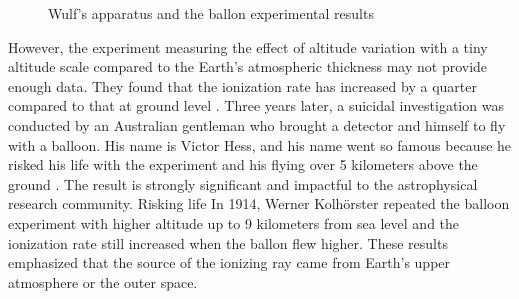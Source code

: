 \begin{figure}[h!]
    \centering
        \hfill
        \caption{Wulf's apparatus and the ballon experimental results}
       \label{fig:xxx}
\end{figure}


However, the experiment measuring the effect of altitude
variation with a tiny altitude scale compared to the Earth's
atmospheric thickness may not provide enough data.
They found that the ionization rate
has increased by a quarter compared to that at ground level
\citep{de2014atmospheric}.
Three years later, a suicidal investigation was conducted by 
an Australian gentleman who brought a detector and himself
to fly with a balloon.
His name is Victor Hess, and his name went so famous
because he risked his life with the experiment 
and his flying over 5 kilometers above the ground \citep{hess1912beobachtungen}.
The result is strongly significant and impactful
to the astrophysical research community. Risking life  
In 1914, Werner Kolhörster repeated the balloon experiment 
with higher altitude up to 9 kilometers from 
sea level and the ionization rate still increased when 
the ballon flew higher. These results emphasized that the source of 
the ionizing ray came from Earth's upper atmosphere
or the outer space.

